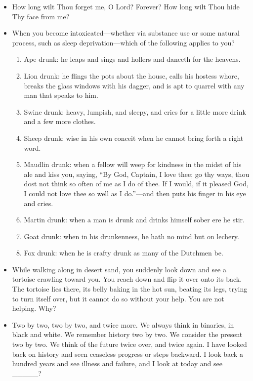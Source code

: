 \begin{itemize}
\tightlist
\item
  How long wilt Thou forget me, O Lord? Forever? How long wilt Thou hide Thy face from me?
\item
  When you become intoxicated---whether via substance use or some natural process, such as sleep deprivation---which of the following applies to you?

  \begin{enumerate}
  \def\labelenumi{\arabic{enumi}.}
  \tightlist
  \item
    Ape drunk: he leaps and sings and hollers and danceth for the heavens.
  \item
    Lion drunk: he flings the pots about the house, calls his hostess whore, breaks the glass windows with his dagger, and is apt to quarrel with any man that speaks to him.
  \item
    Swine drunk: heavy, lumpish, and sleepy, and cries for a little more drink and a few more clothes.
  \item
    Sheep drunk: wise in his own conceit when he cannot bring forth a right word.
  \item
    Maudlin drunk: when a fellow will weep for kindness in the midst of his ale and kiss you, saying, ``By God, Captain, I love thee; go thy ways, thou dost not think so often of me as I do of thee. If I would, if it pleased God, I could not love thee so well as I do.''---and then puts his finger in his eye and cries.
  \item
    Martin drunk: when a man is drunk and drinks himself sober ere he stir.
  \item
    Goat drunk: when in his drunkenness, he hath no mind but on lechery.
  \item
    Fox drunk: when he is crafty drunk as many of the Dutchmen be.
  \end{enumerate}
\item
  While walking along in desert sand, you suddenly look down and see a tortoise crawling toward you. You reach down and flip it over onto its back. The tortoise lies there, its belly baking in the hot sun, beating its legs, trying to turn itself over, but it cannot do so without your help. You are not helping. Why?
\item
  Two by two, two by two, and twice more. We always think in binaries, in black and white. We remember history two by two. We consider the present two by two. We think of the future twice over, and twice again. I have looked back on history and seen ceaseless progress or steps backward. I look back a hundred years and see illness and failure, and I look at today and see \_\_\_\_\_?

\end{itemize}
